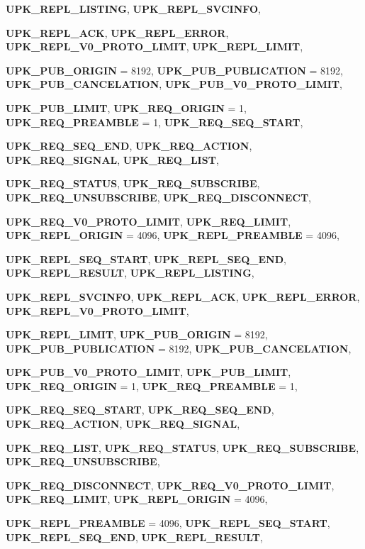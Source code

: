 \begin{DoxyCompactItemize}
{\bf UPK\_\-REPL\_\-LISTING}, 
{\bf UPK\_\-REPL\_\-SVCINFO}, 
\par
{\bf UPK\_\-REPL\_\-ACK}, 
{\bf UPK\_\-REPL\_\-ERROR}, 
{\bf UPK\_\-REPL\_\-V0\_\-PROTO\_\-LIMIT}, 
{\bf UPK\_\-REPL\_\-LIMIT}, 
\par
{\bf UPK\_\-PUB\_\-ORIGIN} =  8192, 
{\bf UPK\_\-PUB\_\-PUBLICATION} =  8192, 
{\bf UPK\_\-PUB\_\-CANCELATION}, 
{\bf UPK\_\-PUB\_\-V0\_\-PROTO\_\-LIMIT}, 
\par
{\bf UPK\_\-PUB\_\-LIMIT}, 
{\bf UPK\_\-REQ\_\-ORIGIN} =  1, 
{\bf UPK\_\-REQ\_\-PREAMBLE} =  1, 
{\bf UPK\_\-REQ\_\-SEQ\_\-START}, 
\par
{\bf UPK\_\-REQ\_\-SEQ\_\-END}, 
{\bf UPK\_\-REQ\_\-ACTION}, 
{\bf UPK\_\-REQ\_\-SIGNAL}, 
{\bf UPK\_\-REQ\_\-LIST}, 
\par
{\bf UPK\_\-REQ\_\-STATUS}, 
{\bf UPK\_\-REQ\_\-SUBSCRIBE}, 
{\bf UPK\_\-REQ\_\-UNSUBSCRIBE}, 
{\bf UPK\_\-REQ\_\-DISCONNECT}, 
\par
{\bf UPK\_\-REQ\_\-V0\_\-PROTO\_\-LIMIT}, 
{\bf UPK\_\-REQ\_\-LIMIT}, 
{\bf UPK\_\-REPL\_\-ORIGIN} =  4096, 
{\bf UPK\_\-REPL\_\-PREAMBLE} =  4096, 
\par
{\bf UPK\_\-REPL\_\-SEQ\_\-START}, 
{\bf UPK\_\-REPL\_\-SEQ\_\-END}, 
{\bf UPK\_\-REPL\_\-RESULT}, 
{\bf UPK\_\-REPL\_\-LISTING}, 
\par
{\bf UPK\_\-REPL\_\-SVCINFO}, 
{\bf UPK\_\-REPL\_\-ACK}, 
{\bf UPK\_\-REPL\_\-ERROR}, 
{\bf UPK\_\-REPL\_\-V0\_\-PROTO\_\-LIMIT}, 
\par
{\bf UPK\_\-REPL\_\-LIMIT}, 
{\bf UPK\_\-PUB\_\-ORIGIN} =  8192, 
{\bf UPK\_\-PUB\_\-PUBLICATION} =  8192, 
{\bf UPK\_\-PUB\_\-CANCELATION}, 
\par
{\bf UPK\_\-PUB\_\-V0\_\-PROTO\_\-LIMIT}, 
{\bf UPK\_\-PUB\_\-LIMIT}, 
{\bf UPK\_\-REQ\_\-ORIGIN} =  1, 
{\bf UPK\_\-REQ\_\-PREAMBLE} =  1, 
\par
{\bf UPK\_\-REQ\_\-SEQ\_\-START}, 
{\bf UPK\_\-REQ\_\-SEQ\_\-END}, 
{\bf UPK\_\-REQ\_\-ACTION}, 
{\bf UPK\_\-REQ\_\-SIGNAL}, 
\par
{\bf UPK\_\-REQ\_\-LIST}, 
{\bf UPK\_\-REQ\_\-STATUS}, 
{\bf UPK\_\-REQ\_\-SUBSCRIBE}, 
{\bf UPK\_\-REQ\_\-UNSUBSCRIBE}, 
\par
{\bf UPK\_\-REQ\_\-DISCONNECT}, 
{\bf UPK\_\-REQ\_\-V0\_\-PROTO\_\-LIMIT}, 
{\bf UPK\_\-REQ\_\-LIMIT}, 
{\bf UPK\_\-REPL\_\-ORIGIN} =  4096, 
\par
{\bf UPK\_\-REPL\_\-PREAMBLE} =  4096, 
{\bf UPK\_\-REPL\_\-SEQ\_\-START}, 
{\bf UPK\_\-REPL\_\-SEQ\_\-END}, 
{\bf UPK\_\-REPL\_\-RESULT}, 
\par

\end{DoxyCompactItemize}
